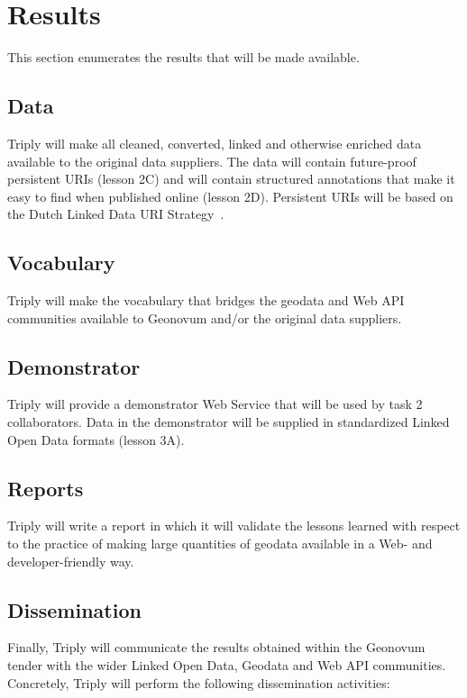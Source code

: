 \documentclass[a4paper]{scrartcl}
\begin{document}
\section{Results}

This section enumerates the results that will be made available.

\subsection{Data}

Triply will make all cleaned, converted, linked and otherwise enriched
data available to the original data suppliers.  The data will contain
future-proof persistent URIs (lesson 2C) and will contain structured
annotations that make it easy to find when published online (lesson
2D).  Persistent URIs will be based on the Dutch Linked Data URI
Strategy~\cite{Overbeek2013}.

\subsection{Vocabulary}

Triply will make the vocabulary that bridges the geodata and Web API
communities available to Geonovum and/or the original data suppliers.

\subsection{Demonstrator}

Triply will provide a demonstrator Web Service that will be used by
task 2 collaborators.  Data in the demonstrator will be supplied in
standardized Linked Open Data formats (lesson 3A).

\subsection{Reports}

Triply will write a report in which it will validate the lessons
learned with respect to the practice of making large quantities of
geodata available in a Web- and developer-friendly way.

\subsection{Dissemination}

Finally, Triply will communicate the results obtained within the
Geonovum tender with the wider Linked Open Data, Geodata and Web API
communities.  Concretely, Triply will perform the following
dissemination activities:
\end{document}
